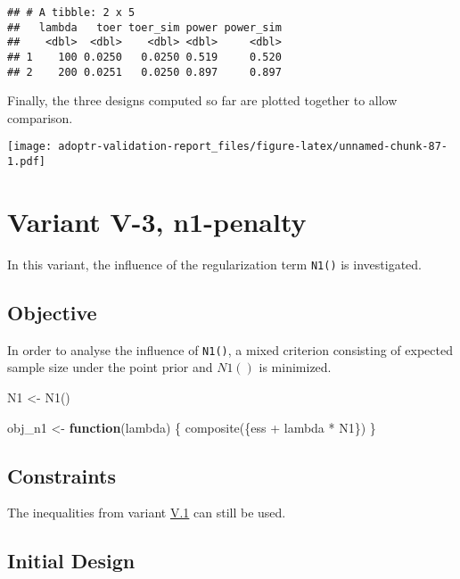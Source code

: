 \documentclass[
]{book}
\newenvironment{Shaded}{\begin{snugshade}}{\end{snugshade}}
\newcommand{\ControlFlowTok}[1]{\textcolor[rgb]{0.13,0.29,0.53}{\textbf{#1}}}
\newcommand{\FunctionTok}[1]{\textcolor[rgb]{0.00,0.00,0.00}{#1}}
\newcommand{\NormalTok}[1]{#1}
\newcommand{\OtherTok}[1]{\textcolor[rgb]{0.56,0.35,0.01}{#1}}
\newcommand{\SpecialCharTok}[1]{\textcolor[rgb]{0.00,0.00,0.00}{#1}}
\begin{document}
\begin{verbatim}
## # A tibble: 2 x 5
##   lambda   toer toer_sim power power_sim
##    <dbl>  <dbl>    <dbl> <dbl>     <dbl>
## 1    100 0.0250   0.0250 0.519     0.520
## 2    200 0.0251   0.0250 0.897     0.897
\end{verbatim}

Finally, the three designs computed so far are plotted together to allow
comparison.

\texttt{[image: adoptr-validation-report\_files/figure-latex/unnamed-chunk-87-1.pdf]}

\hypertarget{variantV_3}{%
\section{Variant V-3, n1-penalty}\label{variantV_3}}

In this variant, the influence of the regularization term \texttt{N1()} is investigated.

\hypertarget{objective-12}{%
\subsection{Objective}\label{objective-12}}

In order to analyse the influence of \texttt{N1()},
a mixed criterion consisting of expected sample size under the point prior
and \(N1()\) is minimized.

\begin{Shaded}
\begin{Highlighting}[]
\NormalTok{N1 }\OtherTok{\textless{}{-}} \FunctionTok{N1}\NormalTok{()}

\NormalTok{obj\_n1 }\OtherTok{\textless{}{-}} \ControlFlowTok{function}\NormalTok{(lambda) \{}
  \FunctionTok{composite}\NormalTok{(\{ess }\SpecialCharTok{+}\NormalTok{ lambda }\SpecialCharTok{*}\NormalTok{ N1\})}
\NormalTok{\}}
\end{Highlighting}
\end{Shaded}

\hypertarget{constraints-12}{%
\subsection{Constraints}\label{constraints-12}}

The inequalities from variant \protect\hyperlink{variantV_1}{V.1} can still be used.

\hypertarget{initial-design-10}{%
\subsection{Initial Design}\label{initial-design-10}}
\end{document}
